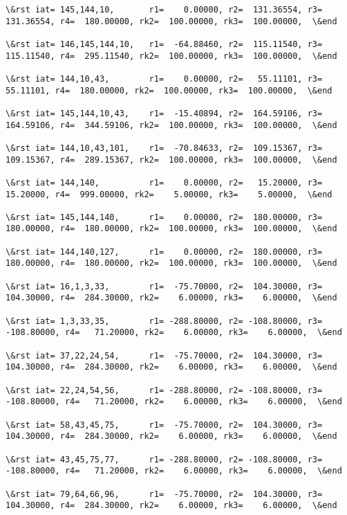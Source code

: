 \documentclass[11pt]{article}
\begin{document}
\begin{Verbatim}[commandchars=\\\{\}]
\&rst iat= 145,144,10,       r1=    0.00000, r2=  131.36554, r3=  131.36554, r4=  180.00000, rk2=  100.00000, rk3=  100.00000,  \&end

\&rst iat= 146,145,144,10,   r1=  -64.88460, r2=  115.11540, r3=  115.11540, r4=  295.11540, rk2=  100.00000, rk3=  100.00000,  \&end

\&rst iat= 144,10,43,        r1=    0.00000, r2=   55.11101, r3=   55.11101, r4=  180.00000, rk2=  100.00000, rk3=  100.00000,  \&end

\&rst iat= 145,144,10,43,    r1=  -15.40894, r2=  164.59106, r3=  164.59106, r4=  344.59106, rk2=  100.00000, rk3=  100.00000,  \&end

\&rst iat= 144,10,43,101,    r1=  -70.84633, r2=  109.15367, r3=  109.15367, r4=  289.15367, rk2=  100.00000, rk3=  100.00000,  \&end

\&rst iat= 144,140,          r1=    0.00000, r2=   15.20000, r3=   15.20000, r4=  999.00000, rk2=    5.00000, rk3=    5.00000,  \&end

\&rst iat= 145,144,140,      r1=    0.00000, r2=  180.00000, r3=  180.00000, r4=  180.00000, rk2=  100.00000, rk3=  100.00000,  \&end

\&rst iat= 144,140,127,      r1=    0.00000, r2=  180.00000, r3=  180.00000, r4=  180.00000, rk2=  100.00000, rk3=  100.00000,  \&end

\&rst iat= 16,1,3,33,        r1=  -75.70000, r2=  104.30000, r3=  104.30000, r4=  284.30000, rk2=    6.00000, rk3=    6.00000,  \&end

\&rst iat= 1,3,33,35,        r1= -288.80000, r2= -108.80000, r3= -108.80000, r4=   71.20000, rk2=    6.00000, rk3=    6.00000,  \&end

\&rst iat= 37,22,24,54,      r1=  -75.70000, r2=  104.30000, r3=  104.30000, r4=  284.30000, rk2=    6.00000, rk3=    6.00000,  \&end

\&rst iat= 22,24,54,56,      r1= -288.80000, r2= -108.80000, r3= -108.80000, r4=   71.20000, rk2=    6.00000, rk3=    6.00000,  \&end

\&rst iat= 58,43,45,75,      r1=  -75.70000, r2=  104.30000, r3=  104.30000, r4=  284.30000, rk2=    6.00000, rk3=    6.00000,  \&end

\&rst iat= 43,45,75,77,      r1= -288.80000, r2= -108.80000, r3= -108.80000, r4=   71.20000, rk2=    6.00000, rk3=    6.00000,  \&end

\&rst iat= 79,64,66,96,      r1=  -75.70000, r2=  104.30000, r3=  104.30000, r4=  284.30000, rk2=    6.00000, rk3=    6.00000,  \&end


\end{Verbatim}
\end{document}
